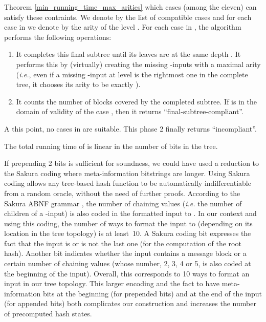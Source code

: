 \documentclass{llncs}
\begin{document}
\begin{enumerate}
\begin{enumerate}
  Theorem \ref{min_running_time_max_arities}
  which cases (among the eleven) can satisfy these contraints. We denote by  the list of compatible cases and for each case  in  we denote by  the arity 
  of the level . For each case  in , the algorithm performs the following operations:
  \begin{enumerate}
   \item It completes this final subtree until its leaves are at the same depth . It performs this 
   by (virtually) creating the missing -inputs with a maximal arity (\emph{i.e.}, even if a missing -input at level  is the rightmost one 
   in the complete tree, it chooses its arity to be exactly ).
   \item It counts the number  of blocks covered by the completed subtree. If  is in the domain of validity of the case , then it returns ``final-subtree-compliant''.
  \end{enumerate}
  A this point, no cases in  are suitable. This phase 2 finally returns ``incompliant''.
 \end{enumerate}


\end{enumerate}

\noindent
The total running time of  is linear in the number of bits in the tree.



\begin{remark}If prepending 2 bits is sufficient \cite{BDPV14_Suf} for soundness, we could have used a reduction to the Sakura coding \cite{BDPV14_Sak} 
where meta-information bitstrings are longer. 
Using Sakura coding allows any tree-based hash function
to be automatically indifferentiable from a random oracle, without the need of further proofs.
According to the Sakura ABNF grammar \cite{BDPV14_Sak}, the number of chaining values (\textit{i.e.} the number of children of a -input) 
is also coded in the formatted input to .  
In our context and using this coding, the number of ways to format the input to  (depending on 
its location in the tree topology) is at least~10. A Sakura coding bit 
expresses the fact that 
the input is or is not the last one (for the computation of the root hash). Another bit indicates whether the input contains a message block
or a certain number of chaining values (whose number, 2, 3, 4 or 5, is also coded at the beginning of the input). 
Overall, this corresponds to 10 ways to format an input in our 
tree topology. This larger encoding and the fact to have meta-information bits at the beginning (for prepended bits) 
and at the end of the input (for appended bits) both complicates our construction and increases the number of precomputed hash states.
\end{remark}
\end{document}
